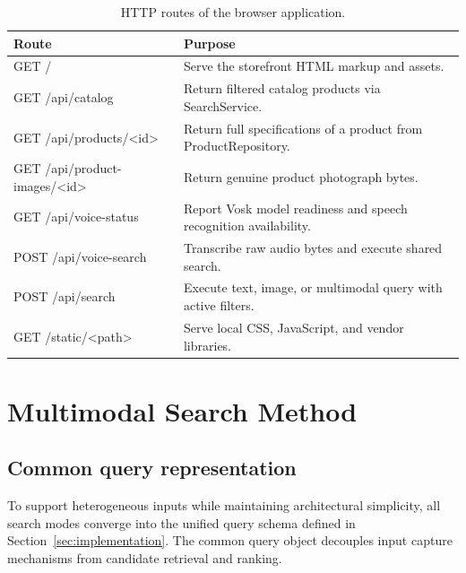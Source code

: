 \documentclass[12pt,a4paper]{article}
\begin{document}
\begin{table}[H]\centering\small
\caption{HTTP routes of the browser application.}\label{tab:http}
\begin{tabularx}{\textwidth}{@{}p{56mm}L@{}}\toprule
\textbf{Route} & \textbf{Purpose} \\\midrule
GET / & Serve the storefront HTML markup and assets. \\
GET /api/catalog & Return filtered catalog products via SearchService. \\
GET /api/products/<id> & Return full specifications of a product from ProductRepository. \\
GET /api/product-images/<id> & Return genuine product photograph bytes. \\
GET /api/voice-status & Report Vosk model readiness and speech recognition availability. \\
POST /api/voice-search & Transcribe raw audio bytes and execute shared search. \\
POST /api/search & Execute text, image, or multimodal query with active filters. \\
GET /static/<path> & Serve local CSS, JavaScript, and vendor libraries. \\
\bottomrule\end{tabularx}\end{table}



\FloatBarrier
\section{Multimodal Search Method}\label{sec:method}

\subsection{Common query representation}
To support heterogeneous inputs while maintaining architectural simplicity, all search modes converge into the unified query schema defined in Section~\ref{sec:implementation}. The common query object decouples input capture mechanisms from candidate retrieval and ranking.
\end{document}
